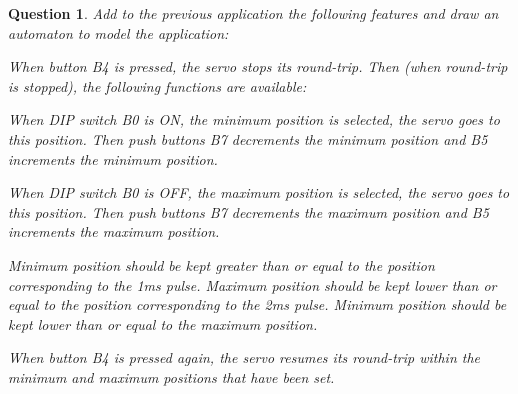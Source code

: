 \documentclass[11pt]{report}
\newtheorem{ex}{Question}
\begin{document}
\begin{ex}
Add to the previous application the following features and draw an automaton to model the application:

When button B4 is pressed, the servo stops its round-trip. Then (when round-trip is stopped), the following functions are available:

When DIP switch B0 is ON, the minimum position is selected, the servo goes to this position. Then push buttons B7 decrements the minimum position and B5 increments the minimum position.

When DIP switch B0 is OFF, the maximum position is selected, the servo goes to this position. Then push buttons B7 decrements the maximum position and B5 increments the maximum position.

Minimum position should be kept greater than or equal to the position corresponding to the 1ms pulse. Maximum position should be kept lower than or equal to the position corresponding to the 2ms pulse. Minimum position should be kept lower than or equal to the maximum position.

When button B4 is pressed again, the servo resumes its round-trip within the minimum and maximum positions that have been set.

\end{ex}
\end{document}
